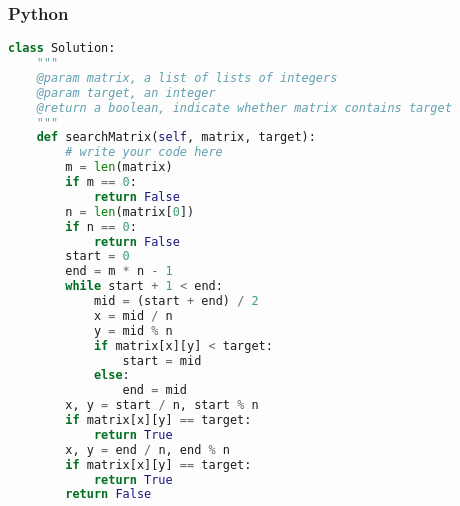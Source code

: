 \subsubsection{Python}
\begin{lstlisting}[language=Python]
class Solution:
    """
    @param matrix, a list of lists of integers
    @param target, an integer
    @return a boolean, indicate whether matrix contains target
    """
    def searchMatrix(self, matrix, target):
        # write your code here
        m = len(matrix)
        if m == 0:
            return False
        n = len(matrix[0])
        if n == 0:
            return False
        start = 0
        end = m * n - 1
        while start + 1 < end:
            mid = (start + end) / 2
            x = mid / n
            y = mid % n
            if matrix[x][y] < target:
                start = mid
            else:
                end = mid
        x, y = start / n, start % n
        if matrix[x][y] == target:
            return True
        x, y = end / n, end % n
        if matrix[x][y] == target:
            return True
        return False
\end{lstlisting}
\normalsize 
